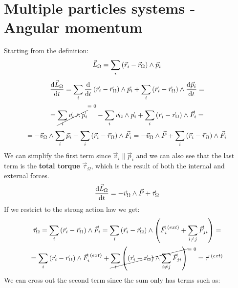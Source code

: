\section{Multiple particles systems - Angular momentum}
Starting from the definition:
\begin{equation}
    \vec{L}_{\Omega} = \displaystyle\sum_{i}\left(\vec{r}_i-\vec{r}_{\Omega}\right)\wedge\vec{p}_i
\end{equation}
\begin{equation}
    \dfrac{\mathrm{d}\vec{L}_{\Omega}}{\mathrm{d}t} = \displaystyle\sum_{i}\dfrac{\mathrm{d}}{\mathrm{d}t}\left(\vec{r}_i-\vec{r}_{\Omega}\right)\wedge\vec{p}_i + \displaystyle\sum_{i}\left(\vec{r}_i-\vec{r}_{\Omega}\right)\wedge\dfrac{\mathrm{d}\vec{p}_i}{\mathrm{d}t} =
\end{equation}
\begin{equation}
    = \crossout{\bigsum_{i}\vec{v}_i\wedge\vec{p}_i}-\bigsum_{i}\vec{v}_{\Omega}\wedge\vec{p}_i + \bigsum_{i}\brackets{\vec{r}_i-\vec{r}_{\Omega}}\wedge\vec{F}_i =
\end{equation}
\begin{equation}
    = -\vec{v}_{\Omega}\wedge\displaystyle\sum_{i}\vec{p}_i + \displaystyle\sum_{i}\left(\vec{r}_i-\vec{r}_{\Omega}\right)\wedge\vec{F}_i = -\vec{v}_{\Omega}\wedge\vec{P} + \displaystyle\sum_{i}\left(\vec{r}_i-\vec{r}_{\Omega}\right)\wedge\vec{F}_i
\end{equation}
We can simplify the first term since $\vec{v}_i \parallel \vec{p}_i$ and we can also see that the last term is the \textbf{total torque} $\vec{\tau}_{\Omega}$, which is the result of both the internal and external forces.
\begin{equation} \label{e:first_angular_expression}
    \dfrac{\mathrm{d}\vec{L}_{\Omega}}{\mathrm{d}t} = -\vec{v}_{\Omega}\wedge\vec{P} + \vec{\tau}_{\Omega}
\end{equation}
If we restrict to the strong action law we get:
\begin{equation}
    \vec{\tau}_{\Omega} = \displaystyle\sum_{i}\left(\vec{r}_i-\vec{r}_{\Omega}\right)\wedge\vec{F}_i = \displaystyle\sum_{i}\left(\vec{r}_i-\vec{r}_{\Omega}\right)\wedge\left(\vec{F}_i^{\;(ext)}+ \displaystyle\sum_{i\neq j}\vec{F}_{ji}\right) =
\end{equation}
\begin{equation}
    = \bigsum_{i}\brackets{\vec{r}_i-\vec{r}_{\Omega}}\wedge\vec{F}_i^{\;(ext)} + \crossout{\bigsum_{i}\brackets{\brackets{\vec{r}_i-\vec{r}_{\Omega}}\wedge\bigsum_{i\neq j}\vec{F}_{ji}}} = \vec{\tau}^{\;(ext)}
\end{equation}
We can cross out the second term since the sum only has terms such as:
